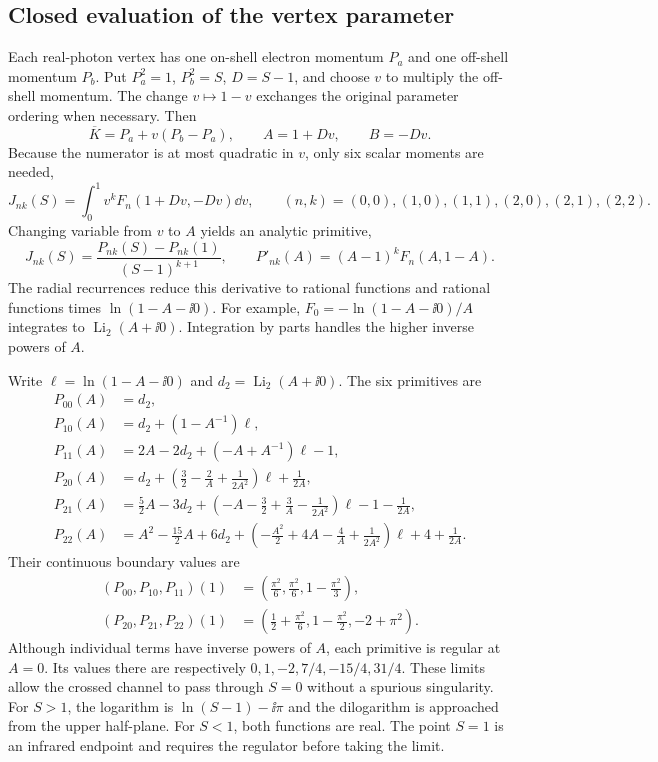 \subsection{Closed evaluation of the vertex parameter}
Each real-photon vertex has one on-shell electron momentum $P_a$
and one off-shell momentum $P_b$. Put $P_a^2=1$, $P_b^2=S$,
$D=S-1$, and choose $v$ to multiply the off-shell momentum.
The change $v\mapsto1-v$ exchanges the original parameter ordering
when necessary. Then
\begin{equation}
 \overline K=P_a+v(P_b-P_a),\qquad A=1+Dv,\qquad B=-Dv.
\end{equation}
Because the numerator is at most quadratic in $v$, only six
scalar moments are needed,
\begin{equation}
 J_{nk}(S)=\int_0^1 v^k F_n(1+Dv,-Dv)\dd v,
 \qquad (n,k)=(0,0),(1,0),(1,1),(2,0),(2,1),(2,2).
\end{equation}
Changing variable from $v$ to $A$ yields an analytic primitive,
\begin{equation}
 J_{nk}(S)=\frac{P_{nk}(S)-P_{nk}(1)}{(S-1)^{k+1}},
 \qquad P'_{nk}(A)=(A-1)^k F_n(A,1-A).
 \label{eq:comp-supp-vertex-closed-moments}
\end{equation}
The radial recurrences reduce this derivative to rational functions
and rational functions times $\ln(1-A-\ii0)$. For example,
$F_0=-\ln(1-A-\ii0)/A$ integrates to
$\operatorname{Li}_2(A+\ii0)$. Integration by parts handles the
higher inverse powers of $A$.

Write $\ell=\ln(1-A-\ii0)$ and
$d_2=\operatorname{Li}_2(A+\ii0)$. The six primitives are
\begin{align}
 P_{00}(A)&=d_2,\\
 P_{10}(A)&=d_2+(1-A^{-1})\ell,\\
 P_{11}(A)&=2A-2d_2+(-A+A^{-1})\ell-1,\\
 P_{20}(A)&=d_2+\left(\frac32-\frac2A+\frac1{2A^2}\right)\ell
                         +\frac1{2A},\\
 P_{21}(A)&=\frac52A-3d_2
  +\left(-A-\frac32+\frac3A-\frac1{2A^2}\right)\ell-1-\frac1{2A},\\
 P_{22}(A)&=A^2-\frac{15}2A+6d_2
  +\left(-\frac{A^2}2+4A-\frac4A+\frac1{2A^2}\right)\ell
  +4+\frac1{2A}.
\end{align}
Their continuous boundary values are
\begin{align}
 (P_{00},P_{10},P_{11})(1)
   &=\left(\frac{\pi^2}6,\frac{\pi^2}6,1-\frac{\pi^2}3\right),\\
 (P_{20},P_{21},P_{22})(1)
   &=\left(\frac12+\frac{\pi^2}6,1-\frac{\pi^2}2,-2+\pi^2\right).
\end{align}
Although individual terms have inverse powers of $A$, each
primitive is regular at $A=0$. Its values there are respectively
$0,1,-2,7/4,-15/4,31/4$. These limits allow the crossed channel to
pass through $S=0$ without a spurious singularity. For $S>1$, the
logarithm is $\ln(S-1)-\ii\pi$ and the dilogarithm is approached
from the upper half-plane. For $S<1$, both functions are real.
The point $S=1$ is an infrared endpoint and requires the regulator
before taking the limit.

